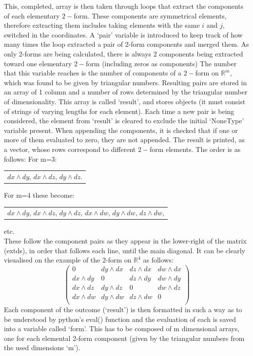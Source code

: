\documentclass[12pt]{report}
\begin{document}
\noindent This, completed, array is then taken through loops that extract the components of each elementary $2-$form. These components are symmetrical elements, therefore extracting them includes taking elements with the same $i$ and $j$, switched in the coordinates. A `pair' variable is introduced to keep track of how many times the loop extracted a pair of 2-form components and merged them. As only 2-forms are being calculated, there is always 2 components being extracted toward one elementary $2-$form (including zeros as components) The number that this variable reaches is the number of components of a $2-$form on $\mathbb{R}^{m}$, which was found to be given by triangular numbers. Resulting pairs are stored in an array of 1 column and a number of rows determined  by the triangular number of dimensionality. This array is called `result', and stores objects (it must consist of strings of varying lengths for each element). Each time a new pair is being considered, the element from `result' is cleared to exclude the initial `NoneType' variable present. When appending the components, it is checked that if one or more of them evaluated to zero, they are not appended.
The result is printed, as a vector, whose rows correspond to different $2-$form elements. The order is as follows:
For m=3:
\begin{center}
	\begin{tabular}{c}
		$ dx \wedge dy$, 
		$ dx \wedge dz$, 
		$ dy \wedge dz$.
	\end{tabular}
\end{center}
For m=4 these become:

\begin{center}
	\begin{tabular}{c}
		$ dx \wedge dy$,
		$ dx \wedge dz$,
		$ dy \wedge dz$,
		$ dx \wedge dw$,
		$ dy \wedge dw$,
		$ dz \wedge dw$,
		
	\end{tabular}
\end{center}
etc.\\
These follow the component pairs as they appear in the lower-right of the matrix (ext\textunderscore ds), in order that follows each line, until the main diagonal.
It can be clearly visualised on the example of the 2-form on $\mathbb{R}^{4}$ as follows:
\begin{equation}
		\begin{pmatrix}
			0 & dy \wedge dx & dz \wedge dx & dw \wedge dx \\
			dx \wedge dy & 0 & dz \wedge dy & dw \wedge dy \\
			dx \wedge dz & dy \wedge dz & 0 & dw \wedge dz \\
			dx \wedge dw & dy \wedge dw & dz \wedge dw & 0 \\
		\end{pmatrix}
\end{equation}
Each component of the outcome (`result') is then formatted in such a way as to be understood by python's eval() function and the evaluation of each is saved into a variable called `form'. This has to be composed of m dimensional arrays, one for each elemental 2-form component (given by the triangular numbers from the used dimensions `m').
\end{document}
